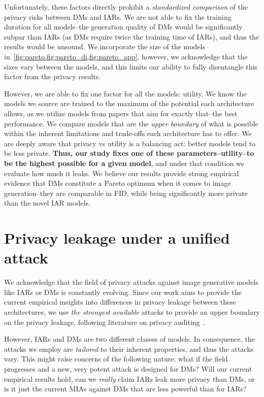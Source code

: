 {Unfortunately, these factors directly prohibit a \textit{standardized comparison} of the privacy risks between DMs and IARs. We are not able to fix the training duration for all models--the generation quality of DMs would be significantly subpar than IARs (as DMs require twice the training time of IARs), and thus the results would be unsound. We incorporate the size of the models in~\cref{fig:pareto,fig:pareto_di,fig:pareto_app}, however, we acknowledge that the sizes vary between the models, and this limits our ability to fully disentangle this factor from the privacy results.}

{However, we are able to fix one factor for all the models: utility. We know the models we source are trained to the maximum of the potential each architecture allows, as we utilize models from papers that aim for exactly that--the best performance. We compare models that are the \textit{upper boundary} of what is possible within the inherent limitations and trade-offs each architecture has to offer. We are deeply aware that privacy vs utility is a balancing act: better models tend to be less private. \textbf{Thus, our study fixes one of these parameters--utility--to be the highest possible for a given model}, and under that condition we evaluate how much it leaks. We believe our results provide strong empirical evidence that DMs constitute a Pareto optimum when it comes to image generation--they are comparable in FID, while being significantly more private than the novel IAR models.}

\section{Privacy leakage under a unified attack}
\label{app:unified_mia}

{We acknowledge that the field of privacy attacks against image generative models like IARs or DMs is constantly evolving. Since our work aims to provide the current empirical insights into differences in privacy leakage between these architectures, we use \textit{the strongest available} attacks to provide an upper boundary on the privacy leakage, following literature on privacy auditing~\citep{nasr2023tight,dwork2006differential}}. 

{However, IARs and DMs are two different classes of models. In consequence, the attacks we employ are \textit{tailored} to their inherent properties, and thus the attacks vary. This might raise concerns of the following nature: what if the field progresses and a new, very potent attack is designed for DMs? Will our current empirical results hold, \ie can we \textit{really} claim IARs leak more privacy than DMs, or is it just the current MIAs against DMs that are less powerful than for IARs?}

